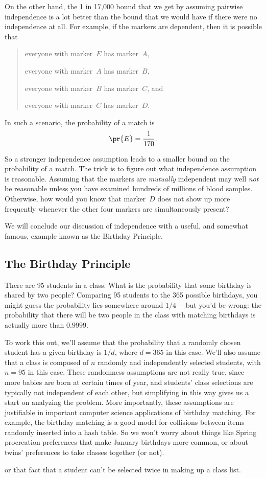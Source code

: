 On the other hand, the 1 in 17,000 bound that we get by assuming
pairwise independence is a lot better than the bound that we would
have if there were no independence at all.  For example, if the
markers are dependent, then it is possible that
\begin{quote}
everyone with marker~$E$ has marker~$A$,

everyone with marker~$A$ has marker~$B$,

everyone with marker~$B$ has marker~$C$, and

everyone with marker~$C$ has marker~$D$.
\end{quote}
In such a scenario, the probability of a match is
\begin{equation*}
    \pr{E} = \frac{1}{170}.
\end{equation*}

So a stronger independence assumption leads to a smaller bound on the
probability of a match.  The trick is to figure out what independence
assumption is reasonable.  Assuming that the markers are
\emph{mutually} independent may well \emph{not} be reasonable unless
you have examined hundreds of millions of blood samples.  Otherwise,
how would you know that marker~$D$ does not show up more frequently
whenever the other four markers are simultaneously present?

We will conclude our discussion of independence with a useful, and
somewhat famous, example known as the Birthday Principle.

\subsection{The Birthday Principle}\label{birthday_principle_sec}

There are 95 students in a class.  What is the probability that some
birthday is shared by two people?  Comparing 95 students to the 365
possible birthdays, you might guess the probability lies somewhere
around $1/4$ ---but you'd be wrong: the probability that there will be
two people in the class with matching birthdays is actually more than
$0.9999$.

To work this out, we'll assume that the probability that a randomly
chosen student has a given birthday is $1/d$, where $d= 365$ in this
case.  We'll also assume that a class is composed of $n$ randomly and
independently selected students, with $n=95$ in this case.  These
randomness assumptions are not really true, since more babies are born
at certain times of year, and students' class selections are typically
not independent of each other, but simplifying in this way gives us a
start on analyzing the problem.  More importantly, these assumptions
are justifiable in important computer science applications of birthday
matching.  For example, the birthday matching is a good model for
collisions between items randomly inserted into a hash table.  So we
won't worry about things like Spring procreation preferences that make
January birthdays more common, or about twins' preferences to take
classes together (or not).  \begin{editingnotes}
or that fact that a student
can't be selected twice in making up a class list.
\end{editingnotes}

